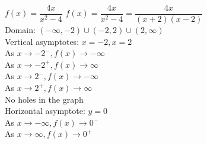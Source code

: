 {$f(x) = \dfrac{4x}{x^2-4}$}
{$f(x) = \dfrac{4x}{x^{2} -4} = \dfrac{4x}{(x + 2)(x - 2)}$\\
Domain: $(-\infty, -2) \cup (-2, 2) \cup (2, \infty)$\\
Vertical asymptotes: $x = -2, x = 2$\\
As $x \rightarrow -2^{-}, f(x) \rightarrow -\infty$\\
As $x \rightarrow -2^{+}, f(x) \rightarrow \infty$\\
As $x \rightarrow 2^{-}, f(x) \rightarrow -\infty$\\
As $x \rightarrow 2^{+}, f(x) \rightarrow \infty$\\
No holes in the graph\\
Horizontal asymptote: $y = 0$ \\
As $x \rightarrow -\infty, f(x) \rightarrow 0^{-}$\\
As $x \rightarrow \infty, f(x) \rightarrow 0^{+}$}